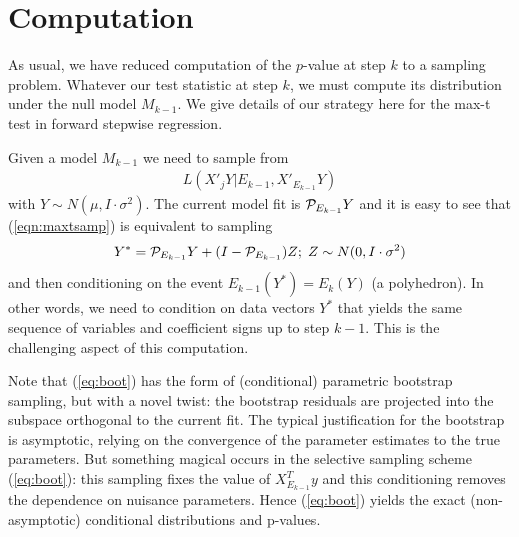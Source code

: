 \documentclass{article}
\begin{document}
\section{Computation}
\label{sec:computation}

As usual, we have reduced computation of the $p$-value at step $k$ to a sampling problem. Whatever our test statistic at step $k$, we must compute its distribution under the null model $M_{k-1}$. We give details of our  strategy here for the max-t test in forward stepwise regression.


Given a model $M_{k-1}$   we need to sample from 
\begin{eqnarray}
L(X'_jY | E_{k-1},X'_{E_{k-1}}Y)
\label{eqn:maxtsamp}
\end{eqnarray}
with $Y\sim N(\mu, I \cdot \sigma^2)$.
The current model fit is $\mathcal{P}_{E_{k-1}} Y$ and it is easy to see that (\ref{eqn:maxtsamp})  is equivalent to sampling
\begin{eqnarray}
Y^*=\mathcal{P}_{E_{k-1}} Y + (I- \mathcal{P}_{E_{k-1}}) Z; \;Z\sim N(0,I\cdot\sigma^2)
\label{eq:boot}
\end{eqnarray}
and then conditioning on the event $E_{k-1}(Y^*)= E_k(Y)$ (a polyhedron).
In other words, we need to condition on data vectors  $Y^*$ that yields the same
sequence of variables and coefficient signs up to step $k-1$. This is the challenging aspect of this computation.

Note that  (\ref{eq:boot})  has the form of  (conditional) parametric bootstrap sampling, but  with  a novel twist:  the bootstrap residuals are projected into the subspace
orthogonal to the current fit.  The typical justification for the bootstrap is asymptotic, relying on the convergence of the parameter estimates to the true parameters.
But something magical  occurs in the selective sampling scheme (\ref{eq:boot}): this  sampling fixes the value of $ X_{E_{k-1}}^Ty$ and this conditioning
removes the dependence on nuisance parameters.
Hence  (\ref{eq:boot}) yields the exact (non-asymptotic) conditional distributions and p-values.
\end{document}
